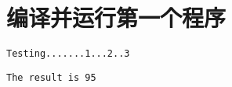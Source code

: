 \chapter{编译并运行第一个程序}
{
    \begin{practice}
        \verb|Testing.......1...2..3|
    \end{practice}

    \begin{practice}
        \verb|The result is 95|
    \end{practice}
}

\cleardoublepage

\endinput
